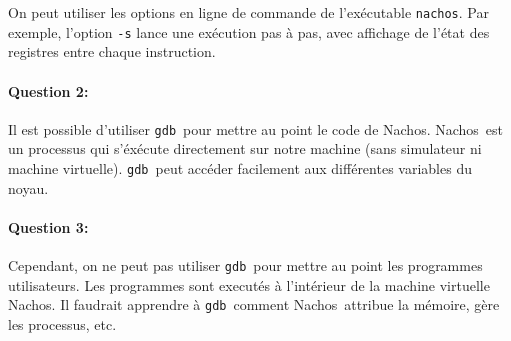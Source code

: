 \documentclass[11pt]{article}
\def\question#1{\paragraph{Question #1:}}
\def\gdb{\texttt{gdb}}
\def\nachos{Nachos}
\begin{document}
On peut utiliser les options en ligne de commande de l'exécutable \texttt{nachos}. Par exemple, l'option \texttt{-s} lance une exécution pas à pas, avec affichage de l'état des registres entre chaque instruction.


\question{2} Il est possible d'utiliser \gdb\ pour mettre au point le code de \nachos. \nachos\ est un processus qui s'éxécute directement sur notre machine (sans simulateur ni machine virtuelle). \gdb\ peut accéder facilement aux différentes variables du noyau.

\question{3} Cependant, on ne peut pas utiliser \gdb\ pour mettre au point les programmes utilisateurs. Les programmes sont executés à l'intérieur de la machine virtuelle \nachos. Il faudrait apprendre à \gdb\ comment \nachos\ attribue la mémoire, gère les processus, etc.
\end{document}
